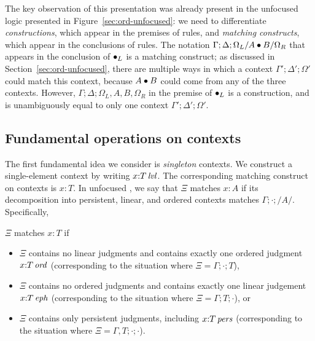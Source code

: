 
The key observation of this presentation was already present in the
unfocused logic presented in Figure~\ref{sec:ord-unfocused}: we need
to differentiate {\it constructions}, which appear in the premises of
rules, and {\it matching constructs}, which appear in the conclusions
of rules.  The notation $\Gamma; \Delta; \Omega_L/A\mathbin{\bullet} B/\Omega_R$
that appears in the conclusion of ${\mathbin{\bullet}}_L$ is a matching construct;
as discussed in Section~\ref{sec:ord-unfocused}, there are multiple
ways in which a context $\Gamma'; \Delta'; \Omega'$ could match this
context, because $A \mathbin{\bullet} B$ could come from any of the three
contexts. However, $\Gamma; \Delta; \Omega_L,{A},{B},
\Omega_R$ in the premise of ${\mathbin{\bullet}}_L$ is a construction, and is
unambiguously equal to only one context $\Gamma'; \Delta'; \Omega'$.

\subsection{Fundamental operations on contexts}

The first fundamental idea we consider is {\it singleton} contexts.
We construct a single-element context by writing $x{:}{T}\,{{\it lvl}}$.
The corresponding matching construct on contexts is 
$x{:}{T}$. In unfocused \ollll, we say that $\Xi$ matches 
$x{:}{A}$ if its decomposition into persistent, linear, and 
ordered contexts matches $\Gamma; \cdot; /A/$. Specifically,

\bigskip
\begin{definition}
  $\Xi$ matches $x{:}T$ if
\begin{itemize}
\item $\Xi$ contains no linear judgments and contains exactly
one
ordered judgment $x{:}{T}\,{{\it ord}}$ (corresponding to the situation where
$\Xi = \Gamma; \cdot; T$), 
\item $\Xi$ contains no ordered judgments and contains exactly
one linear judgement $x{:}{T}\,{{\it eph}}$ (corresponding to the situation where
$\Xi = \Gamma; T; \cdot$), or 
\item $\Xi$ contains only persistent judgments, including
$x{:}{T}\,{{\it pers}}$ (corresponding to the situation where
$\Xi = \Gamma, T; \cdot; \cdot$). 
\end{itemize}
\end{definition}
\bigskip

